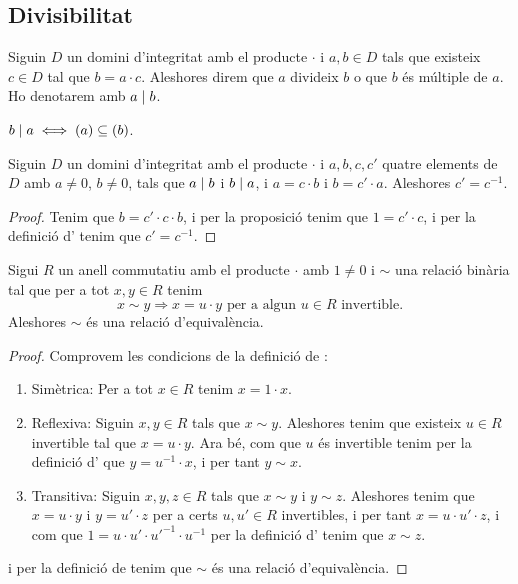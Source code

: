 \documentclass[../Apunts.tex]{subfiles}
\begin{document}
	\subsection{Divisibilitat}
	\begin{definition}
		\label{def:divisor per anells}
		\label{def:múltiple per anells}
		Siguin \(D\) un domini d'integritat amb el producte \(\cdot\) i \(a,b\in D\) tals que existeix \(c\in D\) tal que \(b=a\cdot c\). Aleshores direm que \(a\) divideix \(b\) o que \(b\) és múltiple de \(a\). Ho denotarem amb \(a\mathrel{|} b\).
	\end{definition}
	\begin{observation}
		\label{obs:divisors són ideals continguts}
		\(b\mathrel{|} a\iff(a)\subseteq(b)\).
	\end{observation}
	\begin{proposition}
		\label{prop:podem passar els múltiples de costat a costat}
		Siguin \(D\) un domini d'integritat amb el producte \(\cdot\) i \(a,b,c,c'\) quatre elements de \(D\) amb \(a\neq0\), \(b\neq0\), tals que \(a\mathrel{|} b\) i \(b\mathrel{|} a\), i \(a=c\cdot b\) i \(b=c'\cdot a\). Aleshores \(c'=c^{-1}\).
		\begin{proof}
			Tenim que \(b=c'\cdot c\cdot b\), i per la proposició  tenim que \(1=c'\cdot c\), i per la definició d' tenim que \(c'=c^{-1}\).
		\end{proof}
	\end{proposition}
	\begin{proposition}
		\label{prop:associats és relació d'equivalència}
		Sigui \(R\) un anell commutatiu amb el producte \(\cdot\) amb \(1\neq0\) i \(\sim\) una relació binària tal que per a tot \(x,y\in R\) tenim
		\[x\sim y\Longrightarrow x=u\cdot y\text{ per a algun }u\in R\text{ invertible}.\]
		Aleshores \(\sim\) és una relació d'equivalència.
		\begin{proof}
			Comprovem les condicions de la definició de \myref{def:relació d'equivalència}:
			\begin{enumerate}
				\item Simètrica: Per a tot \(x\in R\) tenim \(x=1\cdot x\).
				\item Reflexiva: Siguin \(x,y\in R\) tals que \(x\sim y\). Aleshores tenim que existeix \(u\in R\) invertible tal que \(x=u\cdot y\). Ara bé, com que \(u\) és invertible tenim per la definició d' que \(y=u^{-1}\cdot x\), i per tant \(y\sim x\).
				\item Transitiva: Siguin \(x,y,z\in R\) tals que \(x\sim y\) i \(y\sim z\). Aleshores tenim que \(x=u\cdot y\) i \(y=u'\cdot z\) per a certs \(u,u'\in R\) invertibles, i per tant \(x=u\cdot u'\cdot z\), i com que \(1=u\cdot u'\cdot {u'}^{-1}\cdot{u}^{-1}\) per la definició d' tenim que \(x\sim z\).
			\end{enumerate}
			i per la definició de  tenim que \(\sim\) és una relació d'equivalència.
		\end{proof}
	\end{proposition}
\end{document}
